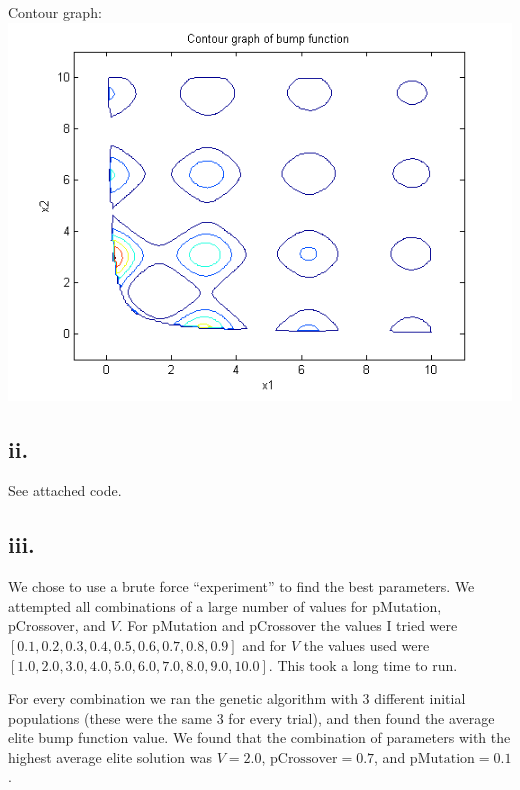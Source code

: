 \documentclass[12pt]{article}
\begin{document}
Contour graph:\\
\includegraphics[height=10cm]{contour.png}

\subsection{ii.}
See attached code.

\subsection{iii.}
We chose to use a brute force ``experiment'' to find the best parameters.  We attempted all combinations of a large number of values for pMutation, pCrossover, and $V$.  For pMutation and pCrossover the values I tried were $[0.1, 0.2, 0.3, 0.4, 0.5, 0.6, 0.7, 0.8, 0.9]$ and for $V$ the values used were $[1.0, 2.0, 3.0, 4.0, 5.0, 6.0, 7.0, 8.0, 9.0, 10.0]$.  This took a long time to run.

For every combination we ran the genetic algorithm with 3 different initial populations (these were the same 3 for every trial), and then found the average elite bump function value.  We found that the combination of parameters with the highest average elite solution was $V=2.0$, $\text{pCrossover} =0.7$, and $\text{pMutation} =0.1$.
\end{document}
